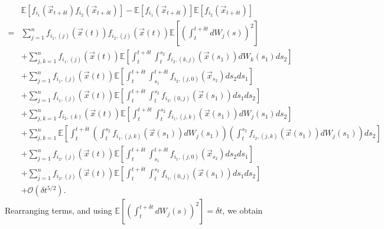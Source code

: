 \documentclass[12pt]{article}
\begin{document}
\begin{equation}
\begin{aligned}
&\mathbb{E} \left[ f_{i_1}(\vec{x}_{t + \delta t}) f_{i_2}(\vec{x}_{t + \delta t}) \right] 
- \mathbb{E} \left[ f_{i_1}(\vec{x}_{t + \delta t}) \right] \mathbb{E} \left[ f_{i_2}(\vec{x}_{t + \delta t}) \right] \\
=& 
 \sum_{j=1}^n f_{{i_1},(j)}(\vec{x}(t)) f_{{i_2},(j)}(\vec{x}(t)) \mathbb{E} \left[ \left( \int_t^{t + \delta t} dW_j(s) \right)^2 \right] \\
&+ \sum_{j,k=1}^n f_{{i_1},(j)}(\vec{x}(t)) \mathbb{E} \left[  \int_t^{t+\delta t} \int_t^{s_2} f_{{i_2},(k,j)}(\vec{x}(s_1)) dW_k(s_1) ds_2 \right] \\
&+ \sum_{j=1}^n f_{{i_1},(j)}(\vec{x}(t)) \mathbb{E} \left[ \int_t^{t+\delta t} \int_{s_1}^{t+\delta t} f_{{i_2},(j,0)}(\vec{x}_{s_2}) ds_2 ds_1 \right]\\
&+ \sum_{j=1}^n f_{{i_1},(j)}(\vec{x}(t)) \mathbb{E} \left[  \int_t^{t+\delta t} \int_t^{s_2} f_{{i_2},(0,j)}(\vec{x}(s_1)) ds_1 ds_2\right] \\
&+  \sum_{j, k=1}^n  f_{{i_2},(k)}(\vec{x}(t))\mathbb{E} \left[ \int_t^{t+\delta t} \int_t^{s_2} f_{{i_1},(j,k)}(\vec{x}(s_1)) dW_j(s_1) ds_2 \right] \\
&+ \sum_{j, k=1}^n \mathbb{E} \left[ \int_t^{t+\delta t}\left( \int_t^{s_2} f_{{i_1},(j,k)}(\vec{x}(s_1)) dW_j(s_1)  \right) \left(  \int_t^{s_2} f_{{i_2},(j,k)}(\vec{x}(s_1)) dW_j(s_1) \right) ds_2 \right] \\
&+  \sum_{j=1}^n f_{{i_2},(j)}(\vec{x}(t)) \mathbb{E} \left[ \int_t^{t+\delta t} \int_{s_1}^{t + \delta t} f_{{i_1},(j,0)}(\vec{x}_{s_2}) ds_2 ds_1 \right]\\
&+   \sum_{j=1}^n  f_{{i_2},(j)}(\vec{x}(t)) \mathbb{E} \left[ \int_t^{t+\delta t} \int_t^{s_2} f_{{i_1},(0,j)}(\vec{x}(s_1)) ds_1 ds_2 \right] \\
&+ \mathcal{O} (\delta t^{5/2}) .
\end{aligned}
\end{equation}
%
Rearranging terms, and using $\mathbb{E} \left[ \left( \int_t^{t + \delta t} dW_j(s) \right)^2 \right] = \delta t$, we obtain
\end{document}
